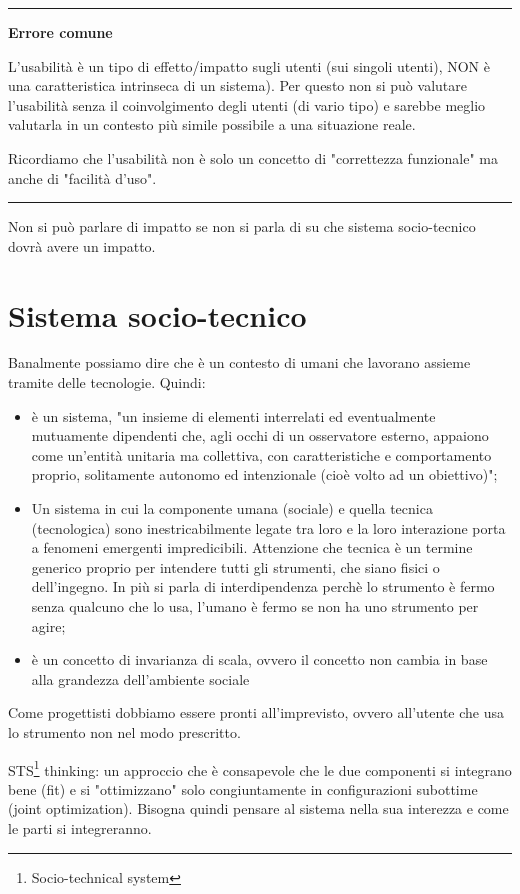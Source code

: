 \documentclass[11pt,a4paper]{book}
\begin{document}
\noindent\rule{\textwidth}{1pt}
\begin{center}
	\textbf{Errore comune}
\end{center}

L'usabilità è un tipo di effetto/impatto sugli utenti (sui singoli utenti), NON è una caratteristica intrinseca di un sistema). Per questo non si può valutare l'usabilità senza il coinvolgimento degli utenti (di vario tipo) e sarebbe meglio valutarla in un contesto più simile possibile a una situazione reale.

Ricordiamo che l'usabilità non è solo un concetto di "correttezza funzionale" ma anche di "facilità d'uso".

\noindent\rule{\textwidth}{1pt}

Non si può parlare di impatto se non si parla di su che sistema socio-tecnico dovrà avere un impatto.
\section{Sistema socio-tecnico}\label{par: sistema sociotecnico}
Banalmente possiamo dire che è un contesto di umani che lavorano assieme tramite delle tecnologie. Quindi:
\begin{itemize}
	\item è un sistema, "un insieme di elementi interrelati ed eventualmente mutuamente dipendenti che, agli occhi di un osservatore esterno, appaiono come un'entità unitaria ma collettiva, con caratteristiche e comportamento proprio, solitamente autonomo ed intenzionale (cioè volto ad un obiettivo)";
	\item Un sistema in cui la componente umana  (sociale) e quella tecnica (tecnologica) sono inestricabilmente legate tra loro e la loro interazione porta a fenomeni emergenti impredicibili. Attenzione che tecnica è un termine generico proprio per intendere tutti gli strumenti, che siano fisici o dell'ingegno. In più si parla di interdipendenza perchè lo strumento è fermo senza qualcuno che lo usa, l'umano è fermo se non ha uno strumento per agire;
	\item è un concetto di invarianza di scala, ovvero il concetto non cambia in base alla grandezza dell'ambiente sociale
\end{itemize}
Come progettisti dobbiamo essere pronti all'imprevisto, ovvero all'utente che usa lo strumento non nel modo prescritto.

STS\footnote{Socio-technical system} thinking: un approccio che è consapevole che le due componenti si integrano bene (fit) e si "ottimizzano" solo congiuntamente in configurazioni subottime (joint optimization). Bisogna quindi pensare al sistema nella sua interezza e come le parti si integreranno.
\end{document}
